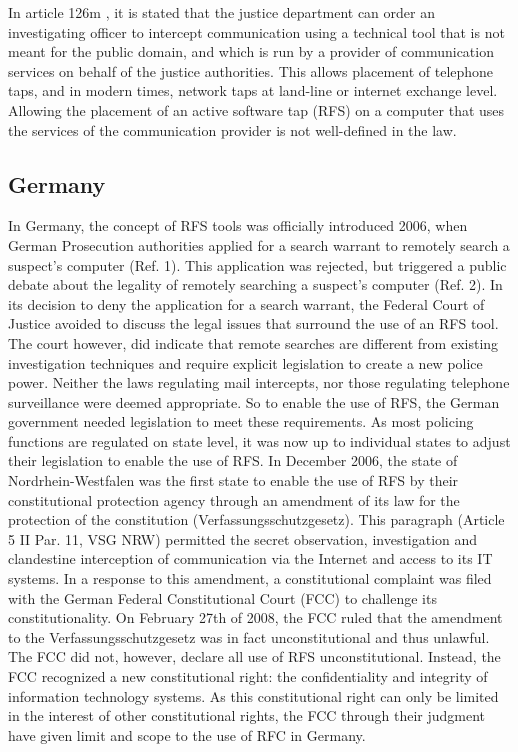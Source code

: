 \documentclass[11pt]{article} %
\begin{document}
In article 126m \cite{wb:sv126m}, it is stated that the justice department can order an investigating officer to intercept communication  using a technical tool that is not meant for the public domain, and which is run by a provider of communication services on behalf of the justice authorities.
This allows placement of telephone taps, and in modern times, network taps at land-line or internet exchange level.
Allowing the placement of an active software tap (RFS) on a computer that uses the services of the communication provider is not well-defined in the law.

\subsection{Germany}
In Germany, the concept of RFS tools was officially introduced 2006, when German Prosecution authorities applied for a search warrant to remotely search a suspect's computer (Ref. 1).
This application was rejected, but triggered a public debate about the legality of remotely searching a suspect's computer (Ref. 2).
In its decision to deny the application for a search warrant, the Federal Court of Justice avoided to discuss the legal issues that surround the use of an RFS tool.
The court however, did indicate that remote searches are different from existing investigation techniques and require explicit legislation to create a new police power.
Neither the laws regulating mail intercepts, nor those regulating telephone surveillance were deemed appropriate.
So to enable the use of RFS, the German government needed legislation to meet these requirements.
As most policing functions are regulated on state level, it was now up to individual states to adjust their legislation to enable the use of RFS.
In December 2006, the state of Nordrhein-Westfalen was the first state to enable the use of RFS by their constitutional protection agency through an amendment of its law for the protection of the constitution (Verfassungsschutzgesetz).
This paragraph (Article 5 II Par. 11, VSG NRW) permitted the secret observation, investigation and clandestine interception of communication via the Internet and access to its IT systems.
In a response to this amendment, a constitutional complaint was filed with the German Federal Constitutional Court (FCC) to challenge its constitutionality. On February 27th of 2008, the FCC ruled that the amendment to the Verfassungsschutzgesetz was in fact unconstitutional and thus unlawful. The FCC did not, however, declare all use of RFS unconstitutional. Instead, the FCC recognized a new constitutional right: the confidentiality and integrity of information technology systems. As this constitutional right can only be limited in the interest of other constitutional rights, the FCC through their judgment have given limit and scope to the use of RFC in Germany.
\end{document}
